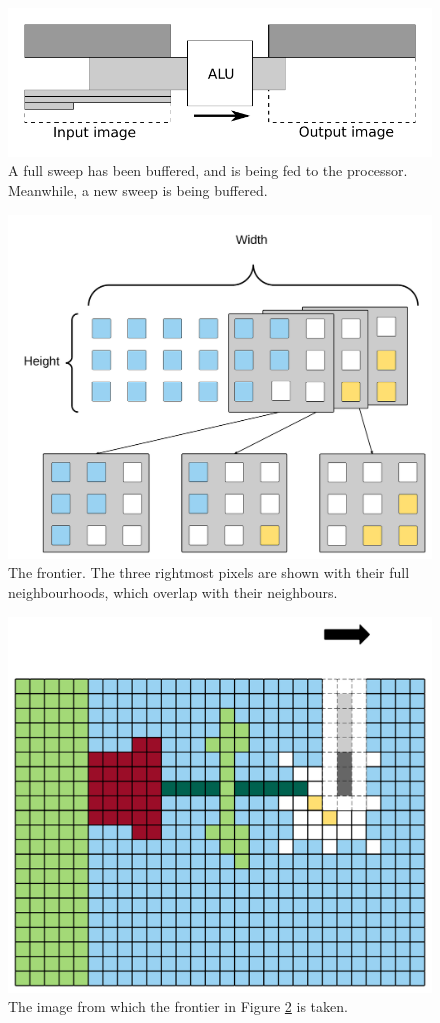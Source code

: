 \begin{figure}[h!]
    \includegraphics[width=\linewidth]{img/daisy_processing.pdf}
    \caption[Buffering and feeding of sweeps.]{A full sweep has been buffered, and is being fed to the processor. Meanwhile, a new sweep is being buffered.}
    \label{fig:sweep_feed}
\end{figure}

\begin{figure}[h!]
    \centering
    \includegraphics[width=\linewidth]{img/frontier1_small.png}
    \caption[The frontier.]{The frontier. The three rightmost pixels are shown with their full neighbourhoods, which overlap with their neighbours.}
    \label{fig:frontier1}
\end{figure}

\begin{figure}[h!]
    \centering
    \includegraphics[width=\linewidth]{img/frontier2_small.png}
    \caption{The image from which the frontier in Figure \ref{fig:frontier1} is taken.}
    \label{fig:frontier2}
\end{figure}
